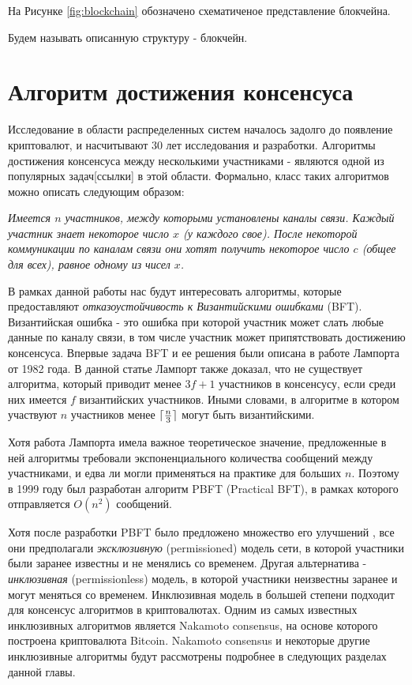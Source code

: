 На Рисунке \ref{fig:blockchain} обозначено схематиченое представление блокчейна.

Будем называть описанную структуру - блокчейн.

\section{Алгоритм достижения консенсуса}
Исследование в области распределенных систем началось задолго до  появление криптовалют, и насчитывают 30 лет исследования и разработки.
Алгоритмы достижения консенсуса между несколькими участниками - являются одной из популярных задач[ссылки] в этой области.
Формально, класс таких алгоритмов можно описать следующим образом:
\par \textit{
Имеется $n$ участников, между которыми установлены каналы связи. Каждый участник знает некоторое число $x$ (у каждого свое).
После некоторой коммуникации по каналам связи они хотят получить некоторое число $c$ (общее для всех),  равное одному из чисел $x$.
}

В рамках данной работы нас будут интересовать алгоритмы, которые предоставляют \textit{отказоустойчивость к Византийскими ошибками} (BFT)\cite{Lamport:1982}.
Византийская ошибка - это ошибка при которой участник может слать любые данные по каналу связи, в том числе участник может припятствовать достижению консенсуса.
Впервые задача BFT и ее решения были описана в работе Лампорта от 1982 года\cite{Lamport:1982}. 
В данной статье Лампорт также доказал, что не существует алгоритма, который приводит менее $3f+1$ участников в консенсусу, если среди них имеется $f$  византийских участников.
Иными словами, в алгоритме в котором участвуют $n$ участников менее $\lceil\frac{n}{3}\rceil$ могут быть византийскими.

Хотя работа Лампорта имела важное теоретическое значение, предложенные в ней алгоритмы требовали экспоненциального количества сообщений между участниками, 
и едва ли могли применяться на практике для больших $n$. Поэтому в 1999 году был разработан алгоритм PBFT (Practical BFT)\cite{pbft},  в рамках которого отправляется $O(n^2)$  сообщений.

Хотя после разработки PBFT было предложено множество его улучшений \cite{qu, hq, Zyzzyva}, все они предполагали \textit{эксклюзивную} (permissioned) модель сети, 
в которой участники были заранее известны и не менялись со временем. Другая альтернатива - \textit{инклюзивная} (permissionless) модель, в которой участники
неизвестны заранее и могут меняться со временем. Инклюзивная модель в большей степени подходит для консенсус алгоритмов в криптовалютах. Одним из самых известных инклюзивных алгоритмов является Nakamoto consensus\cite{nakamoto}, на основе которого построена криптовалюта Bitcoin. Nakamoto consensus и некоторые другие инклюзивные алгоритмы будут рассмотрены подробнее в следующих разделах данной главы.

